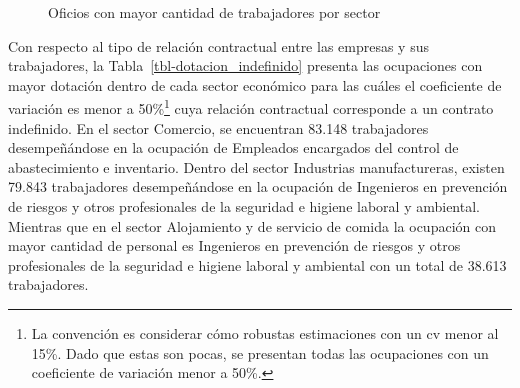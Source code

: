 \documentclass[
  11pt,
]{article}
\begin{document}
\begin{figure}[H]

\caption{\label{fig-dotacion_sector_ocupacion}Oficios con mayor cantidad
de trabajadores por sector}


\end{figure}%

Con respecto al tipo de relación contractual entre las empresas y sus
trabajadores, la Tabla~\ref{tbl-dotacion_indefinido} presenta las
ocupaciones con mayor dotación dentro de cada sector económico para las
cuáles el coeficiente de variación es menor a 50\%\footnote{La
  convención es considerar cómo robustas estimaciones con un cv menor al
  15\%. Dado que estas son pocas, se presentan todas las ocupaciones con
  un coeficiente de variación menor a 50\%.} cuya relación contractual
corresponde a un contrato indefinido. En el sector Comercio, se
encuentran 83.148 trabajadores desempeñándose en la ocupación de
Empleados encargados del control de abastecimiento e inventario. Dentro
del sector Industrias manufactureras, existen 79.843 trabajadores
desempeñándose en la ocupación de Ingenieros en prevención de riesgos y
otros profesionales de la seguridad e higiene laboral y ambiental.
Mientras que en el sector Alojamiento y de servicio de comida la
ocupación con mayor cantidad de personal es Ingenieros en prevención de
riesgos y otros profesionales de la seguridad e higiene laboral y
ambiental con un total de 38.613 trabajadores.
\end{document}
